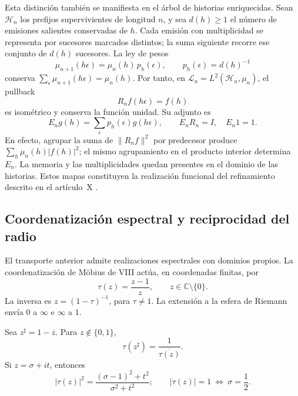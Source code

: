 Esta distinción también se manifiesta en el árbol de
historias enriquecidas. Sean \(\mathcal H_n\) los prefijos
supervivientes de longitud \(n\), y sea \(d(h)\geq1\) el número de
emisiones salientes conservadas de \(h\). Cada emisión con multiplicidad
se representa por sucesores marcados distintos; la suma siguiente recorre
ese conjunto de \(d(h)\) sucesores.
La ley de pesos
\[
 \mu_{n+1}(h\epsilon)=\mu_n(h)\,p_h(\epsilon),
 \qquad p_h(\epsilon)=d(h)^{-1}
\]
conserva
\(\sum_{\epsilon}\mu_{n+1}(h\epsilon)=\mu_n(h)\).
Por tanto, en
\(\mathscr L_n=L^2(\mathcal H_n,\mu_n)\), el pullback
\[
 R_nf(h\epsilon)=f(h)
\]
es isométrico y conserva la función unidad. Su adjunto es
\[
 E_ng(h)=\sum_{\epsilon}p_h(\epsilon)g(h\epsilon),
 \qquad E_nR_n=I,\quad E_n1=1.
\]
En efecto, agrupar la suma de \(\|R_nf\|^2\) por predecesor
produce \(\sum_h\mu_n(h)|f(h)|^2\); el mismo agrupamiento
en el producto interior determina \(E_n\).
La memoria y las multiplicidades quedan presentes en el
dominio de las historias. Estos mapas constituyen la
realización funcional del refinamiento descrito en el
artículo~X \cite{hmtX}.

\subsection{Coordenatización espectral y reciprocidad del radio}

El transporte anterior admite realizaciones espectrales
con dominios propios. La coordenatización de Möbius de VIII actúa,
en coordenadas finitas, por
\begin{equation}
 \tau(z)=\frac{z-1}{z},
 \qquad z\in\mathbb C\setminus\{0\}.
 \label{nt:mobius}
\end{equation}
La inversa es \(z=(1-\tau)^{-1}\), para \(\tau\ne1\).
La extensión a la esfera de Riemann envía \(0\) a
\(\infty\) e \(\infty\) a \(1\).

\begin{proposition}
Sea \(z^\sharp=1-\overline z\). Para
\(z\notin\{0,1\}\),
\begin{equation}
 \tau(z^\sharp)=\frac1{\overline{\tau(z)}}.
 \label{nt:mirror}
\end{equation}
Si \(z=\sigma+it\), entonces
\begin{equation}
 |\tau(z)|^2
 =\frac{(\sigma-1)^2+t^2}{\sigma^2+t^2};
 \qquad
 |\tau(z)|=1\ \Longleftrightarrow\ \sigma=\frac12.
 \label{nt:critical-circle}
\end{equation}
\end{proposition}

